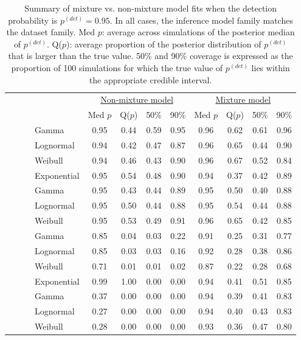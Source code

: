 \documentclass[useAMS,usenatbib,referee,12pt]{article}
\newcommand{\pdet}{p^{(det)}}
\begin{document}
\begin{table}[ht]
\begin{tabular}{l|l|l|l|cccc|cccc}
 \multicolumn{4}{c|}{ } & \multicolumn{4}{c|}{\underline{Non-mixture model}} & \multicolumn{4}{c}{\underline{Mixture model}} \\
 \multicolumn{4}{c|}{ } & Med $p$ & Q($p$) & 50\% & 90\% & Med $p$ & Q($p$) & 50\% & 90\% \\ 
  \hline
  \hline
 \parbox[t]{2mm}{} & \parbox[t]{2mm}{} & \parbox[t]{2mm}{} & Gamma & 0.95 & 0.44 & 0.59 & 0.95 & 0.96 & 0.62 & 0.61 & 0.96 \\ 
   &  &  & Lognormal & 0.94 & 0.42 & 0.47 & 0.87 & 0.96 & 0.65 & 0.44 & 0.90 \\ 
   &  &  & Weibull & 0.94 & 0.46 & 0.43 & 0.90 & 0.96 & 0.67 & 0.52 & 0.84 \\ 
   &  &  & Exponential & 0.95 & 0.54 & 0.48 & 0.90 & 0.94 & 0.37 & 0.42 & 0.89 \\ 
 & & \parbox[t]{2mm}{} & Gamma & 0.95 & 0.43 & 0.44 & 0.89 & 0.95 & 0.50 & 0.40 & 0.88 \\ 
   &  &  & Lognormal & 0.95 & 0.50 & 0.44 & 0.88 & 0.95 & 0.54 & 0.44 & 0.88 \\ 
   &  &  & Weibull & 0.95 & 0.53 & 0.49 & 0.91 & 0.96 & 0.65 & 0.42 & 0.85 \\ 
& \parbox[t]{2mm}{} & \parbox[t]{2mm}{} & Gamma & 0.85 & 0.04 & 0.03 & 0.22 & 0.91 & 0.25 & 0.31 & 0.77 \\ 
   &  &  & Lognormal & 0.85 & 0.03 & 0.03 & 0.16 & 0.92 & 0.28 & 0.38 & 0.86 \\ 
   &  &  & Weibull & 0.71 & 0.01 & 0.01 & 0.02 & 0.87 & 0.22 & 0.28 & 0.68 \\ 
   &  &  & Exponential & 0.99 & 1.00 & 0.00 & 0.00 & 0.94 & 0.41 & 0.51 & 0.85 \\ 
 & & \parbox[t]{2mm}{} & Gamma & 0.37 & 0.00 & 0.00 & 0.00 & 0.94 & 0.39 & 0.41 & 0.83 \\ 
   &  &  & Lognormal & 0.27 & 0.00 & 0.00 & 0.00 & 0.94 & 0.40 & 0.43 & 0.83 \\ 
   &  &  & Weibull & 0.28 & 0.00 & 0.00 & 0.00 & 0.93 & 0.36 & 0.47 & 0.80 \\ 
   \hline
\end{tabular}
\caption{Summary of mixture vs. non-mixture model fits when the detection probability is $\pdet =0.95$.  
In all cases, the inference model family matches the dataset family.  
Med $p$: average across simulations of the posterior median of $\pdet$.  
Q($p$): average proportion of the posterior distribution of $\pdet$ that is larger than the true value.  
50\% and 90\% coverage is expressed as the proportion of 100 simulations for which the true value of $\pdet$ lies within the appropriate credible interval.}
\label{tbl:mix95}
\end{table}
\end{document}
